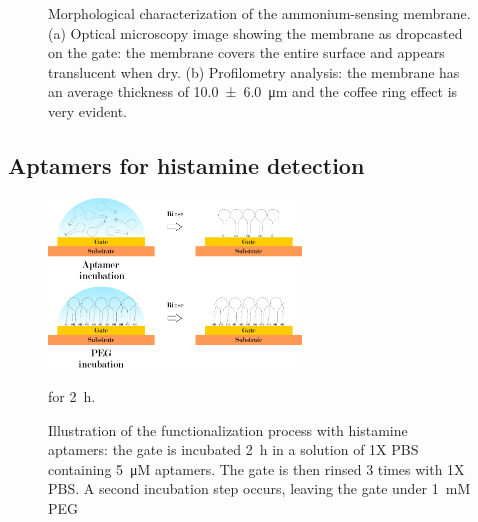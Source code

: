 \begin{figure}[hb]
    \centering
     \quad
    \caption{Morphological characterization of the ammonium-sensing membrane. (a) Optical microscopy image showing the membrane as dropcasted on the gate: the membrane covers the entire surface and appears translucent when dry. (b) Profilometry analysis: the membrane has an average thickness of \SI{10.0 \pm 6.0}{\um} and the coffee ring effect is very evident.}
    \label{fig:gateMembraneCharacterization}
\end{figure}

\subsection{Aptamers for histamine detection}
\label{sec:hist_aptamers}

\begin{figure}
    \centering
    \includegraphics[width=0.6\textwidth]{figures/chapter2/functionalization/Fig12_functionalizationAptamer.pdf}
    \caption{Illustration of the functionalization process with histamine aptamers: the gate is incubated \SI{2}{\hour} in a solution of 1X PBS containing \SI{5}{\micro M} aptamers. The gate is then rinsed 3 times with 1X PBS. A second incubation step occurs, leaving the gate under \SI{1}{mM} PEG} for \SI{2}{\hour}.
    \label{fig:functionalizationAptamers}
\end{figure}

